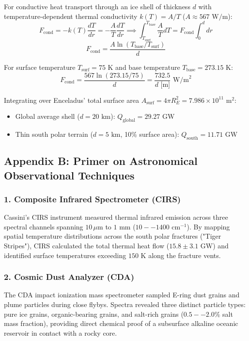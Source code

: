 \documentclass[11pt,a4paper]{article}
\begin{document}
For conductive heat transport through an ice shell of thickness $d$ with temperature-dependent thermal conductivity $k(T) = A / T$ ($A \approx 567\text{ W/m}$):
\begin{equation}
F_{\text{cond}} = -k(T) \frac{dT}{dr} = -\frac{A}{T} \frac{dT}{dr} \implies \int_{T_{\text{surf}}}^{T_{\text{base}}} \frac{A}{T} dT = F_{\text{cond}} \int_0^d dr
\end{equation}
\begin{equation}
F_{\text{cond}} = \frac{A \ln (T_{\text{base}} / T_{\text{surf}})}{d}
\end{equation}

For surface temperature $T_{\text{surf}} = 75\text{ K}$ and base temperature $T_{\text{base}} = 273.15\text{ K}$:
\begin{equation}
F_{\text{cond}} = \frac{567 \ln(273.15 / 75)}{d} = \frac{732.5}{d\text{ [m]}}\text{ W/m}^2
\end{equation}

Integrating over Enceladus' total surface area $A_{\text{surf}} = 4 \pi R_E^2 = 7.986 \times 10^{11}\text{ m}^2$:
\begin{itemize}
    \item Global average shell ($d = 20\text{ km}$): $Q_{\text{global}} = 29.27\text{ GW}$
    \item Thin south polar terrain ($d = 5\text{ km}$, 10\% surface area): $Q_{\text{south}} = 11.71\text{ GW}$
\end{itemize}

\subsection*{Appendix B: Primer on Astronomical Observational Techniques}

\subsubsection*{1. Composite Infrared Spectrometer (CIRS)}
Cassini's CIRS instrument measured thermal infrared emission across three spectral channels spanning $10\,\mu\text{m}$ to $1\text{ mm}$ ($10--1400\text{ cm}^{-1}$). By mapping spatial temperature distributions across the south polar fractures ("Tiger Stripes"), CIRS calculated the total thermal heat flow ($15.8 \pm 3.1\text{ GW}$) and identified surface temperatures exceeding $150\text{ K}$ along the fracture vents.

\subsubsection*{2. Cosmic Dust Analyzer (CDA)}
The CDA impact ionization mass spectrometer sampled E-ring dust grains and plume particles during close flybys. Spectra revealed three distinct particle types: pure ice grains, organic-bearing grains, and salt-rich grains ($0.5--2.0\%$ salt mass fraction), providing direct chemical proof of a subsurface alkaline oceanic reservoir in contact with a rocky core.
\end{document}
